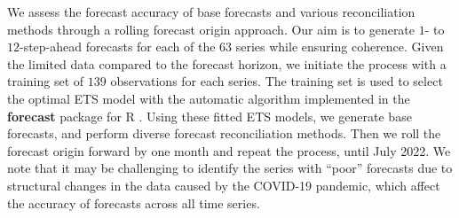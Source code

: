 \documentclass[
  11pt]{article}
\theoremstyle{plain}
\theoremstyle{remark}
\begin{document}
We assess the forecast accuracy of base forecasts and various
reconciliation methods through a rolling forecast origin approach. Our
aim is to generate \(1\)- to \(12\)-step-ahead forecasts for each of the
\(63\) series while ensuring coherence. Given the limited data compared
to the forecast horizon, we initiate the process with a training set of
\(139\) observations for each series. The training set is used to select
the optimal ETS model with the automatic algorithm implemented in the
\textbf{forecast} package for R \citep{HK08}. Using these fitted ETS
models, we generate base forecasts, and perform diverse forecast
reconciliation methods. Then we roll the forecast origin forward by one
month and repeat the process, until July 2022. We note that it may be
challenging to identify the series with ``poor'' forecasts due to
structural changes in the data caused by the COVID-19 pandemic, which
affect the accuracy of forecasts across all time series.
\end{document}
